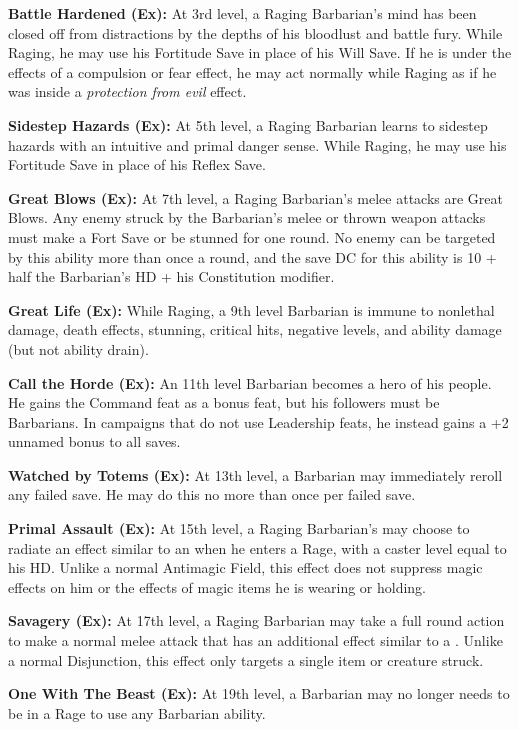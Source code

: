 \textbf{Battle Hardened (Ex):} At 3rd level, a Raging Barbarian's mind has been closed off from distractions by the depths of his bloodlust and battle fury. While Raging, he may use his Fortitude Save in place of his Will Save. If he is under the effects of a compulsion or fear effect, he may act normally while Raging as if he was inside a \textit{protection from evil} effect.

\textbf{Sidestep Hazards (Ex):} At 5th level, a Raging Barbarian learns to sidestep hazards with an intuitive and primal danger sense. While Raging, he may use his Fortitude Save in place of his Reflex Save.

\textbf{Great Blows (Ex):} At 7th level, a Raging Barbarian's melee attacks are Great Blows. Any enemy struck by the Barbarian's melee or thrown weapon attacks must make a Fort Save or be stunned for one round. No enemy can be targeted by this ability more than once a round, and the save DC for this ability is 10 + half the Barbarian's HD + his Constitution modifier.

\textbf{Great Life (Ex):} While Raging, a 9th level Barbarian is immune to nonlethal damage, death effects, stunning, critical hits, negative levels, and ability damage (but not ability drain).

\textbf{Call the Horde (Ex):} An 11th level Barbarian becomes a hero of his people. He gains the Command feat as a bonus feat, but his followers must be Barbarians. In campaigns that do not use Leadership feats, he instead gains a +2 unnamed bonus to all saves.

\textbf{Watched by Totems (Ex):} At 13th level, a Barbarian may immediately reroll any failed save. He may do this no more than once per failed save.

\textbf{Primal Assault (Ex):} At 15th level, a Raging Barbarian's may choose to radiate an effect similar to an  when he enters a Rage, with a caster level equal to his HD. Unlike a normal Antimagic Field, this effect does not suppress magic effects on him or the effects of magic items he is wearing or holding.

\textbf{Savagery (Ex):} At 17th level, a Raging Barbarian may take a full round action to make a normal melee attack that has an additional effect similar to a . Unlike a normal Disjunction, this effect only targets a single item or creature struck.

\textbf{One With The Beast (Ex):} At 19th level, a Barbarian may no longer needs to be in a Rage to use any Barbarian ability.
